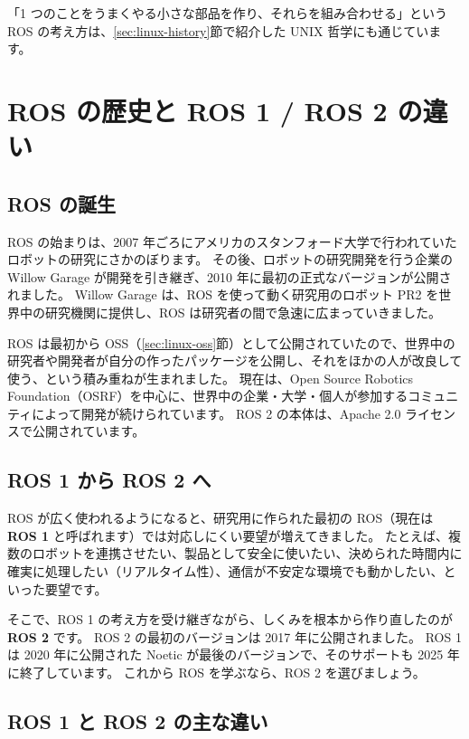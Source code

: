 「1 つのことをうまくやる小さな部品を作り、それらを組み合わせる」という ROS の考え方は、\ref{sec:linux-history}節で紹介した UNIX 哲学にも通じています。

\section{ROS の歴史と ROS 1 / ROS 2 の違い}
\label{sec:what-is-ros-history}

\subsection{ROS の誕生}

ROS の始まりは、2007 年ごろにアメリカのスタンフォード大学で行われていたロボットの研究にさかのぼります。
その後、ロボットの研究開発を行う企業の Willow Garage が開発を引き継ぎ、2010 年に最初の正式なバージョンが公開されました。
Willow Garage は、ROS を使って動く研究用のロボット PR2 を世界中の研究機関に提供し、ROS は研究者の間で急速に広まっていきました。

ROS は最初から OSS（\ref{sec:linux-oss}節）として公開されていたので、世界中の研究者や開発者が自分の作ったパッケージを公開し、それをほかの人が改良して使う、という積み重ねが生まれました。
現在は、Open Source Robotics Foundation（OSRF）を中心に、世界中の企業・大学・個人が参加するコミュニティによって開発が続けられています。
ROS 2 の本体は、Apache 2.0 ライセンスで公開されています。

\subsection{ROS 1 から ROS 2 へ}

ROS が広く使われるようになると、研究用に作られた最初の ROS（現在は \textbf{ROS 1} と呼ばれます）では対応しにくい要望が増えてきました。
たとえば、複数のロボットを連携させたい、製品として安全に使いたい、決められた時間内に確実に処理したい（リアルタイム性）、通信が不安定な環境でも動かしたい、といった要望です。

そこで、ROS 1 の考え方を受け継ぎながら、しくみを根本から作り直したのが \textbf{ROS 2} です。
ROS 2 の最初のバージョンは 2017 年に公開されました。
ROS 1 は 2020 年に公開された Noetic が最後のバージョンで、そのサポートも 2025 年に終了しています。
これから ROS を学ぶなら、ROS 2 を選びましょう。

\subsection{ROS 1 と ROS 2 の主な違い}

